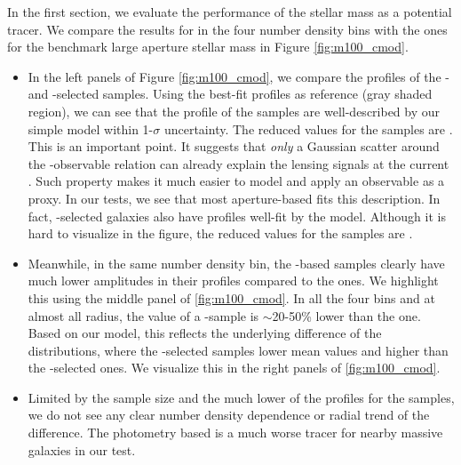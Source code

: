 \documentclass[a4paper,fleqn,usenatbib]{mnras}
\begin{document}
    In the first section, we evaluate the performance of the \cmodel{} stellar mass as a
    potential \mvir{} tracer.
    We compare the results for \mcmodel{} in the four number density bins with the ones for
    the benchmark large aperture stellar mass  in Figure \ref{fig:m100_cmod}.


    \begin{itemize}

        \item In the left panels of Figure \ref{fig:m100_cmod}, we compare the \rdsigma{} profiles
            of the \mcmodel{}- and -selected samples.
            Using the best-fit profiles as reference (gray shaded region), we can see that the
            \dsigma{} profile of the  samples are well-described by our simple model
            within 1-$\sigma$ uncertainty.
            The reduced \chisq{} values for the \maper{} samples are \todo{[XX, XX, XX, XX]}.
            This is an important point. It suggests that \emph{only} a Gaussian scatter around
            the \mvir{}-observable relation can already explain the lensing signals at
            the current \snratio{}.
            Such property makes it much easier to model and apply an observable as a \mvir{} proxy.
            In our tests, we see that most aperture-based \mstar{} fits this description.
            In fact, \cmodel{}-selected galaxies also have \dsigma{} profiles well-fit by the model.
            Although it is hard to visualize in the figure, the reduced \chisq{} values for the
            \mcmodel{} samples are \todo{[XX, XX, XX, XX]}.

        \item Meanwhile, in the same number density bin, the \mcmodel{}-based samples clearly have
            much lower amplitudes in their \dsigma{} profiles compared to the  ones.
            We highlight this using the middle panel of \ref{fig:m100_cmod}.
            In all the four bins and at almost all radius, the \dsigma{} value of a \mcmodel{}-sample
            is $\sim$20-50\% lower than the  one.
            Based on our model, this reflects the underlying difference of the \mvir{} distributions,
            where the \mcmodel{}-selected samples lower mean \mvir{} values and higher \sighalo{}
            than the -selected ones.
            We visualize this in the right panels of \ref{fig:m100_cmod}.

        \item Limited by the sample size and the much lower \snratio{} of the \dsigma{} profiles
            for the \mcmodel{} samples, we do not see any clear number density dependence or radial
            trend of the difference.
            The \cmodel{} photometry based \mstar{} is a much worse \mvir{} tracer for nearby
            massive galaxies in our test.


\end{itemize}
\end{document}
